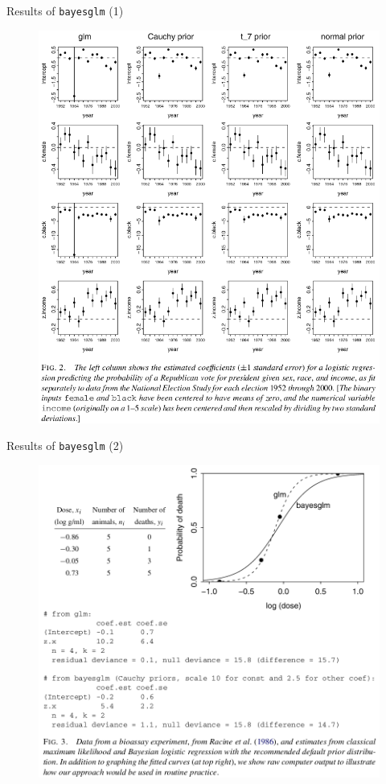 \documentclass{beamer}
\begin{document}
\begin{frame}{Results of \texttt{bayesglm} (1)}
	\begin{figure}
		\includegraphics[scale=0.278]{imgs/result1.png}
	\end{figure}
\end{frame}

\begin{frame}{Results of \texttt{bayesglm} (2)}
	\begin{figure}
		\includegraphics[scale=0.278]{imgs/result2.png}
	\end{figure}
\end{frame}
\end{document}
